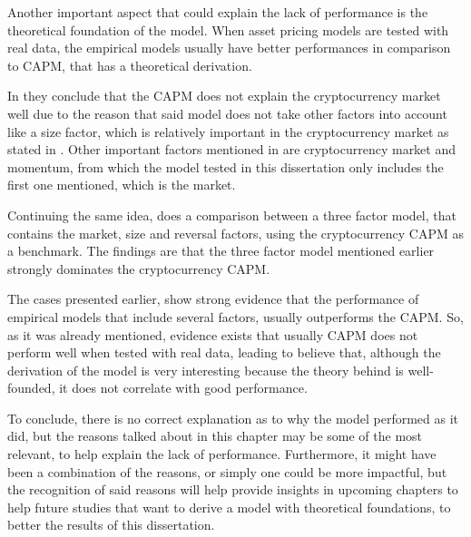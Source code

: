 Another important aspect that could explain the lack of performance is the theoretical foundation of the model. When asset pricing models are tested with real data, the empirical models usually have better performances in comparison to CAPM, that has a theoretical derivation.

In \parencite{jiang2022comparison} they conclude that the CAPM does not explain the cryptocurrency market well due to the reason that said model does not take other factors into account like a size factor, which is relatively important in the cryptocurrency market as stated in \parencite{liu2022common}. Other important factors mentioned in \parencite{liu2022common} are cryptocurrency market and momentum, from which the model tested in this dissertation only includes the first one mentioned, which is the market.

Continuing the same idea, \parencite{Shen2020} does a comparison between a three factor model, that contains the market, size and reversal factors, using the cryptocurrency CAPM as a benchmark. The findings are that the three factor model mentioned earlier strongly dominates the cryptocurrency CAPM.

The cases presented earlier, show strong evidence that the performance of empirical models that include several factors, usually outperforms the CAPM. So, as it was already mentioned, evidence exists that usually CAPM does not perform well when tested with real data, leading to believe that, although the derivation of the model is very interesting because the theory behind is well-founded, it does not correlate with good performance.

To conclude, there is no correct explanation as to why the model performed as it did, but the reasons talked about in this chapter may be some of the most relevant, to help explain the lack of performance. Furthermore, it might have been a combination of the reasons, or simply one could be more impactful, but the recognition of said reasons will help provide insights in upcoming chapters to help future studies that want to derive a model with theoretical foundations, to better the results of this dissertation.




